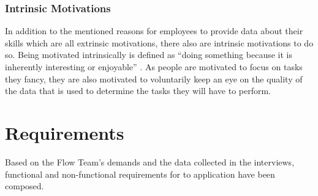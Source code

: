 \subsubsection{Intrinsic Motivations}
In addition to the mentioned reasons for employees to provide data about their skills which are all extrinsic motivations,
there also are intrinsic motivations to do so. Being motivated intrinsically is defined as ``doing something because it is inherently interesting or enjoyable'' \cite{RYAN200054}. As people are motivated to focus on tasks they fancy, they are also motivated to voluntarily keep an eye on the quality of the data that is used to determine the tasks they will have to perform.

\newpage

\section{Requirements}
Based on the Flow Team's demands and the data collected in the interviews, functional and non-functional requirements for to application have been composed.

\label{requirements}
